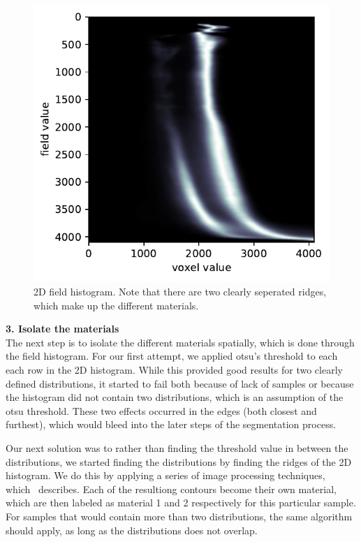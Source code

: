 \begin{figure}
    \includegraphics[width=\linewidth]{figures/fb-gauss+edt-bone_region3.pdf}
    \caption{2D field histogram. Note that there are two clearly seperated ridges, which make up the different materials.}
    \label{fig:field-hist}
\end{figure}

\vspace{\baselineskip}
\noindent\textbf{3. Isolate the materials} \\
The next step is to isolate the different materials spatially, which is done through the field histogram.
For our first attempt, we applied otsu's threshold to each each row in the 2D histogram. 
While this provided good results for two clearly defined distributions, it started to fail both because of lack of samples or because the histogram did not contain two distributions, which is an assumption of the otsu threshold. 
These two effects occurred in the edges (both closest and furthest), which would bleed into the later steps of the segmentation process. 

Our next solution was to rather than finding the threshold value in between the distributions, we started finding the distributions by finding the ridges of the 2D histogram. 
We do this by applying a series of image processing techniques, which~ describes.
Each of the resultiong contours become their own material, which are then labeled as material 1 and 2 respectively for this particular sample. For samples that would contain more than two distributions, the same algorithm should apply, as long as the distributions does not overlap. 

